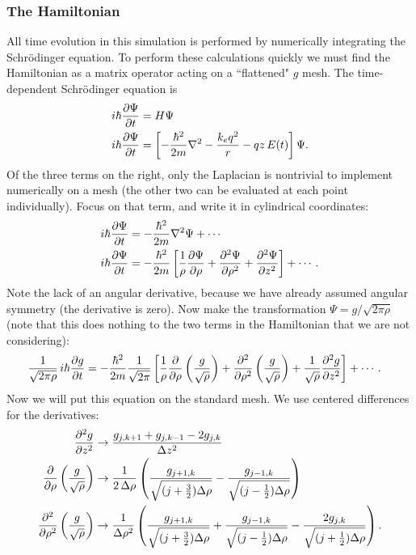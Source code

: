 \documentclass[12pt]{article}
\numberwithin{equation}{section}
\begin{document}
\subsubsection{The Hamiltonian}\label{sec:cylindrical_hamiltonian}
All time evolution in this simulation is performed by numerically integrating the Schr\"{o}dinger equation. To perform these calculations quickly we must find the Hamiltonian as a matrix operator acting on a ``flattened" $g$ mesh. The time-dependent Schr\"{o}dinger equation is
\begin{align}
i \hbar \pdv{\Psi}{t} &= H \Psi \nonumber \\
i \hbar \pdv{\Psi}{t} &= \left[-\frac{\hbar^2}{2m} \laplacian - \frac{k_e q^2}{r} - q z \, E(t)\right] \Psi.
\end{align}
Of the three terms on the right, only the Laplacian is nontrivial to implement numerically on a mesh (the other two can be evaluated at each point individually). Focus on that term, and write it in cylindrical coordinates:
\begin{align}
i\hbar\pdv{\Psi}{t} &= -\frac{\hbar^2}{2m} \laplacian \Psi + \cdots \nonumber \\
i\hbar\pdv{\Psi}{t} &= -\frac{\hbar^2}{2m} \left[\frac{1}{\rho} \pdv{\Psi}{\rho} + \pdv[2]{\Psi}{\rho} + \pdv[2]{\Psi}{z}\right] + \cdots.
\end{align}
Note the lack of an angular derivative, because we have already assumed angular symmetry (the derivative is zero). Now make the transformation $\Psi = g/\sqrt{2 \pi \rho}$ (note that this does nothing to the two terms in the Hamiltonian that we are not considering):
\begin{align}
\frac{1}{\sqrt{2\pi\rho}} \, i \hbar \pdv{g}{t} &= -\frac{\hbar^2}{2m} \frac{1}{\sqrt{2\pi}} \left[\frac{1}{\rho} \pdv{}{\rho}\left(\frac{g}{\sqrt{\rho}}\right) + \pdv[2]{}{\rho}\left(\frac{g}{\sqrt{\rho}}\right) + \frac{1}{\sqrt{\rho}}\pdv[2]{g}{z}\right] + \cdots.
\end{align}
Now we will put this equation on the standard mesh. We use centered differences for the derivatives:
\begin{align}
\pdv[2]{g}{z} &\rightarrow \frac{g_{j, k+1} + g_{j, k-1} - 2g_{j,k}}{\Delta z^2} \nonumber \\
\pdv{}{\rho}\left(\frac{g}{\sqrt{\rho}}\right) &\rightarrow \frac{1}{2 \, \Delta \rho} \left( \frac{g_{j+1, k}}{\sqrt{(j+\frac{3}{2}) \Delta \rho}} - \frac{g_{j-1, k}}{\sqrt{(j-\frac{1}{2}) \Delta \rho}} \right) \nonumber \\
\pdv[2]{}{\rho}\left(\frac{g}{\sqrt{\rho}}\right) &\rightarrow  \frac{1}{\Delta \rho^2} \left( \frac{g_{j+1,k}}{\sqrt{(j+\frac{3}{2}) \Delta \rho}} + \frac{g_{j-1,k}}{\sqrt{(j-\frac{1}{2}) \Delta \rho}} - \frac{2g_{j,k}}{\sqrt{(j+\frac{1}{2}) \Delta \rho}}\right).
\end{align}
\end{document}
